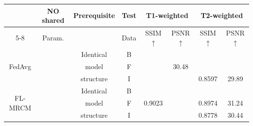 \documentclass[letterpaper]{article} %
\newcommand{\xmark}{\ding{55}}%
\begin{document}
\begin{table}
\centering
\resizebox{\columnwidth}{!}
{
\begin{tabular}{cccc|cc|cc}
\toprule
&\multirow{2}{*}{NO shared } &\multirow{3}{*}{Prerequisite}
&Test &\multicolumn{2}{c|}{{{T1-weighted}}} &\multicolumn{2}{c}{{{T2-weighted}}}  \\
\cmidrule{5-8}
&Param. &  &{Data} &{SSIM$\uparrow$} &{PSNR$\uparrow$} &{SSIM$\uparrow$} &{PSNR$\uparrow$}  \\
\midrule
\multirow{3}{*}{FedAvg}
&\multirow{3}{*}{\xmark} %
&{Identical} &\cellcolor{gray0}B &\cellcolor{gray0}{0.9317} &\cellcolor{gray0}{34.91} 
&\cellcolor{gray0}{0.9173} &\cellcolor{gray0}{30.68}  
\\
& &{model}  &\cellcolor{gray1}F  &\cellcolor{gray1}{0.8803} &\cellcolor{gray1}30.48 &\cellcolor{gray1}{0.8782} &\cellcolor{gray1}{30.09} \\
& &{structure} &\cellcolor{gray2}I &\cellcolor{gray2}{0.9232} &\cellcolor{gray2}{32.31} &\cellcolor{gray2}0.8597 &\cellcolor{gray2}29.89 \\
\midrule

\multirow{3}{*}{FL-MRCM}
&\multirow{3}{*}{\xmark} %
&{Identical} &\cellcolor{gray0}B &\cellcolor{gray0}{0.9577} &\cellcolor{gray0}{36.88} 
&\cellcolor{gray0}{0.9308} &\cellcolor{gray0}{34.28}  
\\
& &{model} &\cellcolor{gray1}F &\cellcolor{gray1}0.9023 &\cellcolor{gray1}{33.63} &\cellcolor{gray1}0.8974 &\cellcolor{gray1}31.24 \\
& &{structure} &\cellcolor{gray2}I &\cellcolor{gray2}{0.9362} &\cellcolor{gray2}{33.29} &\cellcolor{gray2}0.8778 &\cellcolor{gray2}30.44  \\
\midrule \midrule


\end{tabular}}
\end{table}
\end{document}
